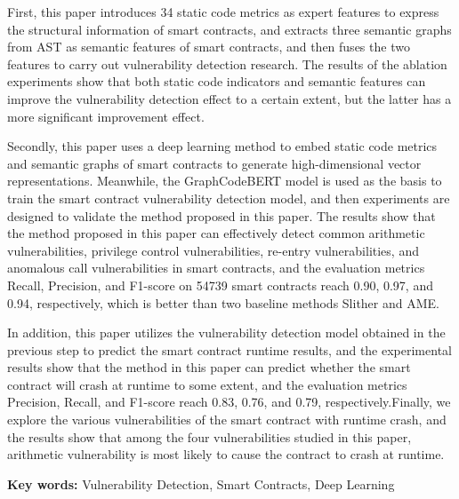 First, this paper introduces 34 static code metrics as expert features to express the structural information of smart contracts, and extracts three semantic graphs from AST as semantic features of smart contracts, and then fuses the two features to carry out vulnerability detection research. The results of the ablation experiments show that both static code indicators and semantic features can improve the vulnerability detection effect to a certain extent, but the latter has a more significant improvement effect.

Secondly, this paper uses a deep learning method to embed static code metrics and semantic graphs of smart contracts to generate high-dimensional vector representations. Meanwhile, the GraphCodeBERT model is used as the basis to train the smart contract vulnerability detection model, and then experiments are designed to validate the method proposed in this paper. The results show that the method proposed in this paper can effectively detect common arithmetic vulnerabilities, privilege control vulnerabilities, re-entry vulnerabilities, and anomalous call vulnerabilities in smart contracts, and the evaluation metrics Recall, Precision, and F1-score on \num{54739} smart contracts reach 0.90, 0.97, and 0.94, respectively, which is better than two baseline methods Slither and AME.
    
In addition, this paper utilizes the vulnerability detection model obtained in the previous step to predict the smart contract runtime results, and the experimental results show that the method in this paper can predict whether the smart contract will crash at runtime to some extent, and the evaluation metrics Precision, Recall, and F1-score reach 0.83, 0.76, and 0.79, respectively.Finally, we explore the various vulnerabilities of the smart contract with runtime crash, and the results show that among the four vulnerabilities studied in this paper, arithmetic vulnerability is most likely to cause the contract to crash at runtime.

\hspace*{\fill}

\noindent \textbf{Key words: } Vulnerability Detection, Smart Contracts, Deep Learning
